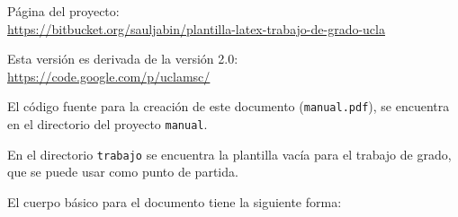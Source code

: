 \introduccion


\noindent
Página del proyecto: \\ {\footnotesize \url{https://bitbucket.org/sauljabin/plantilla-latex-trabajo-de-grado-ucla}}

\noindent
Esta versión es derivada de la versión 2.0: \\ \url{https://code.google.com/p/uclamsc/}

El código fuente para la creación de este documento (\texttt{manual.pdf}), se encuentra en el directorio del proyecto \texttt{manual}.

En el directorio \texttt{trabajo} se encuentra la plantilla vacía para el trabajo de grado, que se puede usar como punto de partida.

El cuerpo básico para el documento tiene la siguiente forma:


